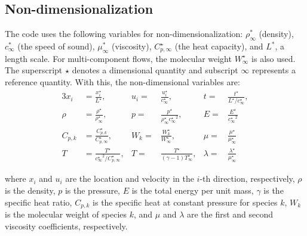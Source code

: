 \documentclass[12pt]{article}
\begin{document}
\subsection{Non-dimensionalization \label{sec:nondimensional}}
The code uses the following variables for non-dimensionalization: $\rho_\infty^*$ (density), $c_\infty^*$ (the speed of sound), $\mu_\infty^*$ (viscosity), $C_{p,\infty}^{\star}$ (the heat capacity), and $L^*$, a length scale. For multi-component flows, the molecular weight $W_\infty^\star$ is also used. The superscript $\star$ denotes a dimensional quantity and subscript $\infty$ represents a reference quantity. With this, the non-dimensional variables are:
\begin{alignat*}{3}
x_i &= \frac{x_i^{\star}}{L^{\star}}, &{}u_i ={}& \frac{u_i^{\star}}{c_{\infty}^{\star}},  &t=& \frac{t^{\star}}{L^{\star}/c_{\infty}^{\star}},  \\
\rho &= \frac{\rho^{\star}}{\rho_{\infty}^{\star}},   &{}p={}& \frac{p^{\star}}{\rho_{\infty}^{\star} {c_{\infty}^{\star}}^2 }, &{}E={}&\frac{E^{\star}}{ {c_{\infty}^{\star}}^2 } \\
C_{p,k} &=  \frac{C_{p,k}^{\star}}{C_{p,\infty}^{\star}}, &{}W_k ={}& \frac{W_{k}^{\star}}{W_{\infty}^{\star}}, &\mu = &\frac{\mu^{\star}}{\mu_{\infty}^{\star}} \\
T &= \frac{T^{\star}}{{c_{\infty}^{\star}}^2 / C_{p,\infty}^{\star}}, &{}T={}&\frac{T^{\star}}{(\gamma-1)T_{\infty}^{\star}}, &{}\lambda ={}& \frac{\lambda^{\star}}{\mu_{\infty}^{\star}}
\end{alignat*}
\begin{comment}
\begin{align}
x_i &= \frac{x_i^{\star}}{L^{\star}}, \quad
u_i = \frac{u_i^{\star}}{c_{\infty}^{\star}}, \quad t = \frac{t^{\star}}{L^{\star}/c_{\infty}^{\star}}
\nonumber\\  \rho &= \frac{\rho^{\star}}{\rho_{\infty}^{\star}},  \quad p = \frac{p^{\star}}{\rho_{\infty}^{\star} {c_{\infty}^{\star}}^2 }, \quad E = \frac{E^{\star}}{ {c_{\infty}^{\star}}^2 }, 
\nonumber \\
C_{p,k} &= W_k^{-1} = \frac{C_{p,k}^{\star}}{C_{p,\infty}^{\star}} = \frac{W_{\infty}^{\star}}{W_{k}^{\star}}, \quad T = \frac{T^{\star}}{{c_{\infty}^{\star}}^2 / C_{p,\infty}^{\star}}=\frac{T^{\star}}{(\gamma-1)T_{\infty}^{\star}}, 
\nonumber \\
\mu &= \frac{\mu^{\star}}{\mu_{\infty}^{\star}}, \quad \lambda = \frac{\lambda^{\star}}{\mu_{\infty}^{\star}},
\end{align}
\end{comment}
where $x_i$ and $u_i$ are the location and velocity in the $i$-th direction, respectively, $\rho$ is the density, $p$ is the pressure, $E$ is the total energy per unit mass, $\gamma$ is the specific heat ratio, $C_{p,k}$ is the specific heat at constant pressure for species $k$, $W_k$ is the molecular weight of species $k$, and $\mu$ and $\lambda$ are the first and second viscosity coefficients, respectively.
\end{document}
